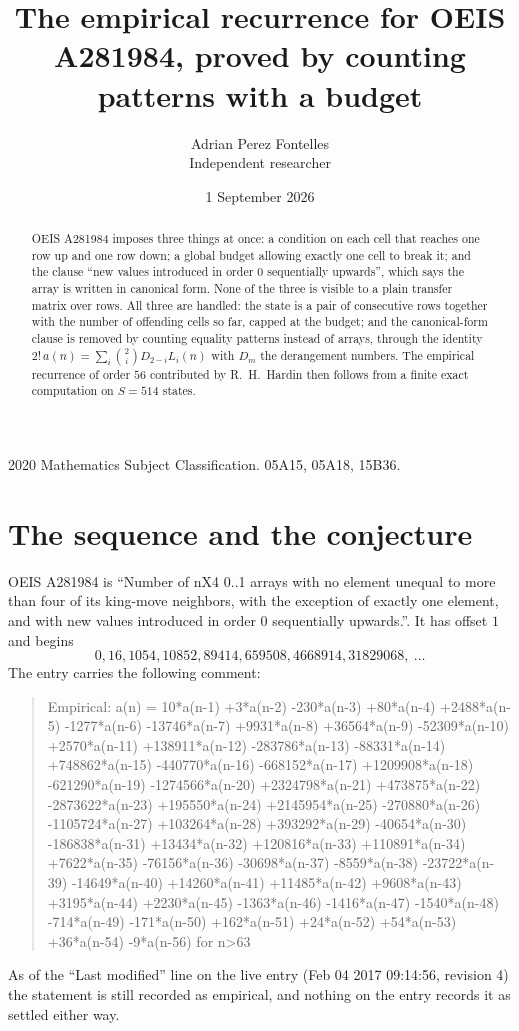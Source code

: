 \documentclass[11pt,a4paper]{article}
\title{The empirical recurrence for OEIS A281984, proved by counting patterns with a budget}
\author{Adrian Perez Fontelles\\ \small Independent researcher}
\date{1 September 2026}
\theoremstyle{plain}
\theoremstyle{definition}
\begin{document}
\maketitle

\begin{abstract}
OEIS A281984 imposes three things at once: a condition on each cell that reaches one row up and
one row down; a global budget allowing exactly one cell to
break it; and the clause ``new values introduced in order $0$ sequentially upwards'', which
says the array is written in canonical form. None of the three is visible to a plain transfer
matrix over rows. All three are handled: the state is a pair of consecutive rows
together with the number of offending cells so far, capped at the budget; and the
canonical-form clause is removed by counting equality patterns instead of arrays, through the
identity $2!\,a(n)=\sum_i\binom{2}{i}D_{2-i}L_i(n)$ with $D_m$ the derangement
numbers. The empirical recurrence of order $56$ contributed by R.~H.~Hardin then follows
from a finite exact computation on $S=514$ states.
\end{abstract}

\noindent\small 2020 Mathematics Subject Classification. 05A15, 05A18, 15B36.\normalsize

\section{The sequence and the conjecture}

OEIS A281984 is ``Number of nX4 0..1 arrays with no element unequal to more than four of its king-move neighbors, with the exception of exactly one element, and with new values introduced in order 0 sequentially upwards.''. It has offset $1$ and begins
\[
0, 16, 1054, 10852, 89414, 659508, 4668914, 31829068,\ \dots
\]
The entry carries the following comment:
\begin{quote}\small
Empirical: a(n) = 10*a(n-1) +3*a(n-2) -230*a(n-3) +80*a(n-4) +2488*a(n-5) -1277*a(n-6) -13746*a(n-7) +9931*a(n-8) +36564*a(n-9) -52309*a(n-10) +2570*a(n-11) +138911*a(n-12) -283786*a(n-13) -88331*a(n-14) +748862*a(n-15) -440770*a(n-16) -668152*a(n-17) +1209908*a(n-18) -621290*a(n-19) -1274566*a(n-20) +2324798*a(n-21) +473875*a(n-22) -2873622*a(n-23) +195550*a(n-24) +2145954*a(n-25) -270880*a(n-26) -1105724*a(n-27) +103264*a(n-28) +393292*a(n-29) -40654*a(n-30) -186838*a(n-31) +13434*a(n-32) +120816*a(n-33) +110891*a(n-34) +7622*a(n-35) -76156*a(n-36) -30698*a(n-37) -8559*a(n-38) -23722*a(n-39) -14649*a(n-40) +14260*a(n-41) +11485*a(n-42) +9608*a(n-43) +3195*a(n-44) +2230*a(n-45) -1363*a(n-46) -1416*a(n-47) -1540*a(n-48) -714*a(n-49) -171*a(n-50) +162*a(n-51) +24*a(n-52) +54*a(n-53) +36*a(n-54) -9*a(n-56) for n>63
\end{quote}
As of the ``Last modified'' line on the live entry (Feb 04 2017 09:14:56, revision 4) the statement is
still recorded as empirical, and nothing on the entry records it as settled either way.
\end{document}
